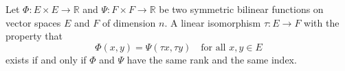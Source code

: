 Let $\Phi: E \times E \to \mathbb{R}$ and $\Psi: F \times F \to \mathbb{R}$ be two symmetric bilinear functions on vector spaces $E$ and $F$ of dimension $n$. A linear isomorphism $\tau: E \to F$ with the property that
$$\Phi(x, y) = \Psi(\tau x, \tau y) \quad \text{for all } x, y \in E$$
exists if and only if $\Phi$ and $\Psi$ have the same rank and the same index.
